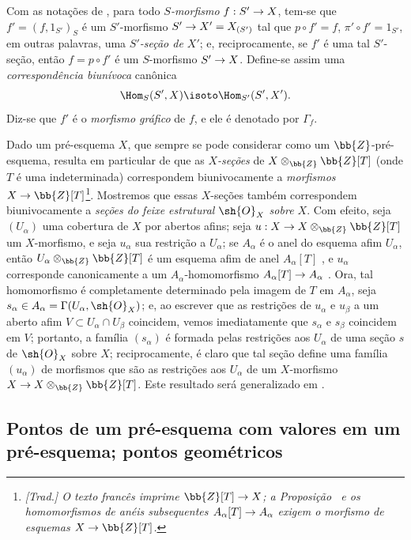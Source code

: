 \documentclass[oneside]{amsart}
\makeatletter
\newcommand{\ega@arrow}[2]{\mathchoice{#1}{#2}{#2}{#2}}
\renewcommand{\to}{\ega@arrow{\longrightarrow}{\rightarrow}}
\let\EGAOriginalLabel\label
\renewcommand{\label}[1]{\phantomsection\EGAOriginalLabel{#1}}
\makeatother
\begin{document}
\begin{env}[3.3.14]
\label{I.3.3.14}
Com as notações de , para todo \emph{$S$-morfismo}
$f:S'\to X$, tem-se que $f'=(f,1_{S'})_S$ é um $S'$-morfismo
$S'\to X'=X_{(S')}$ tal que $p\circ f'=f$, $\pi'\circ f'=1_{S'}$, em outras
palavras, uma \emph{$S'$-seção de $X'$}; e, reciprocamente, se $f'$ é uma tal
$S'$-seção, então $f=p\circ f'$ é um $S$-morfismo $S'\to X$. Define-se assim
uma \emph{correspondência biunívoca} canônica
\[
  \Hom_S(S',X)\isoto\Hom_{S'}(S',X').
\]
Diz-se que $f'$ é o \emph{morfismo gráfico} de $f$, e ele é denotado por
$\Gamma_f$.
\end{env}

\begin{env}[3.3.15]
\label{I.3.3.15}
Dado um pré-esquema $X$, que sempre se pode considerar como um
$\bb{Z}$-pré-esquema, resulta em particular de  que as
\emph{$X$-seções} de $X\otimes_\bb{Z}\bb{Z}[T]$ (onde $T$ é uma
indeterminada) correspondem biunivocamente a \emph{morfismos}
$X\to\bb{Z}[T]$\footnote{\emph{[Trad.] O texto francês imprime
$\bb{Z}[T]\to X$; a Proposição~ e os homomorfismos de anéis
subsequentes $A_\alpha[T]\to A_\alpha$ exigem o morfismo de esquemas
$X\to\bb{Z}[T]$.}}. Mostremos que essas $X$-seções também correspondem
biunivocamente a \emph{seções do feixe estrutural $\sh{O}_X$ sobre $X$}.
Com efeito, seja $(U_\alpha)$ uma cobertura de $X$ por abertos afins; seja
$u:X\to X\otimes_\bb{Z}\bb{Z}[T]$ um $X$-morfismo, e seja $u_\alpha$ sua
restrição a $U_\alpha$; se $A_\alpha$ é o anel do esquema afim $U_\alpha$,
então $U_\alpha\otimes_\bb{Z}\bb{Z}[T]$ é um esquema afim de anel
$A_\alpha[T]$ , e $u_\alpha$ corresponde canonicamente a um
$A_\alpha$-homomorfismo $A_\alpha[T]\to A_\alpha$ . Ora, tal
homomorfismo é completamente determinado pela imagem de $T$ em $A_\alpha$,
seja $s_\alpha\in A_\alpha=\Gamma(U_\alpha,\sh{O}_X)$; e, ao escrever que as
restrições de $u_\alpha$ e $u_\beta$ a um aberto afim
$V\subset U_\alpha\cap U_\beta$ coincidem, vemos imediatamente que
$s_\alpha$ e $s_\beta$ coincidem em $V$; portanto, a família $(s_\alpha)$ é
formada pelas restrições aos $U_\alpha$ de uma seção $s$ de $\sh{O}_X$ sobre
$X$; reciprocamente, é claro que tal seção define uma família $(u_\alpha)$
de morfismos que são as restrições aos $U_\alpha$ de um $X$-morfismo
$X\to X\otimes_\bb{Z}\bb{Z}[T]$. Este resultado será generalizado em
.
\end{env}

\subsection{Pontos de um pré-esquema com valores em um pré-esquema; pontos geométricos}
\label{subsection:I.3.4}
\end{document}
